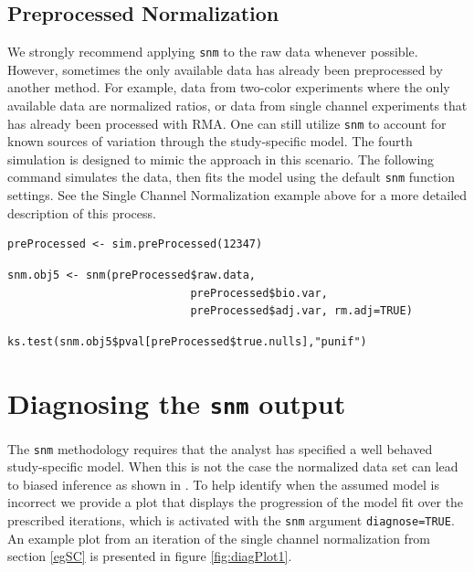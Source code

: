 \documentclass[11pt]{article}
\newcommand{\Rfunction}[1]{{\texttt{#1}}}
\begin{document}
\subsection{Preprocessed Normalization}\label{egPP}
We strongly recommend applying \Rfunction{snm} to the raw data whenever possible.  However, sometimes the only available data has already been preprocessed by another method.  For example, data from two-color experiments where the only available data are normalized ratios, or data from single channel experiments that has already been processed with RMA.  One can still utilize \Rfunction{snm} to account for known sources of variation through the study-specific model. The fourth simulation is designed to mimic the approach in this scenario.  The following command simulates the data, then fits the model using the default \Rfunction{snm} function settings.  See the Single Channel Normalization example above for a more detailed description of this process.

\begin{verbatim}
preProcessed <- sim.preProcessed(12347)
\end{verbatim}

\begin{verbatim}
snm.obj5 <- snm(preProcessed$raw.data, 
                            preProcessed$bio.var, 
                            preProcessed$adj.var, rm.adj=TRUE)
\end{verbatim}

\begin{verbatim}
ks.test(snm.obj5$pval[preProcessed$true.nulls],"punif")
\end{verbatim}

\section{Diagnosing the \Rfunction{snm} output}\label{Diagnosing}
The \Rfunction{snm} methodology requires that the analyst has specified a well behaved study-specific model. When this is not  the case the normalized data set can lead to biased inference as shown in \cite{mecham2010}. To help identify when the assumed model is incorrect we provide a plot that displays the progression of the model fit over the prescribed iterations, which is activated with the \Rfunction{snm} argument {\tt diagnose=TRUE}.  An example plot from an iteration of the single channel normalization from section \ref{egSC} is presented in figure \ref{fig:diagPlot1}.
\end{document}
